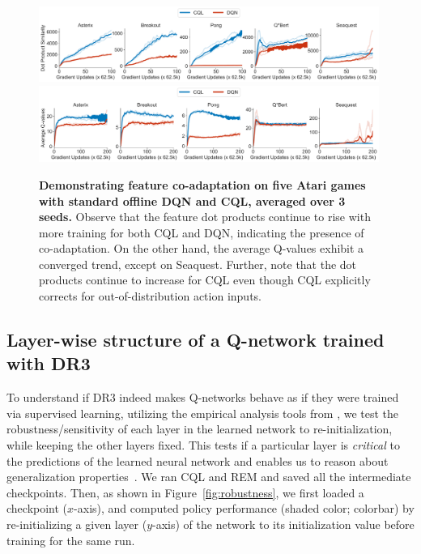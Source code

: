 \begin{figure}[H]
    \centering
    \vspace{-0.1in}
    \includegraphics[width=0.99\textwidth]{chapters/dr3/figures_iclr/figure1_dotproduct_value.pdf}
    \includegraphics[width=0.99\textwidth]{chapters/dr3/figures_iclr/figure1_q_vals.pdf}
    \vspace{-5pt}
    \caption{\footnotesize{\label{fig:dot_product_increases_five_games} \textbf{Demonstrating feature co-adaptation on five Atari games with standard offline DQN and CQL, averaged over 3 seeds.} Observe that the feature dot products continue to rise with more training for both CQL and DQN, indicating the presence of co-adaptation. On the other hand, the average Q-values exhibit a converged trend, except on Seaquest. Further, note that the dot products continue to increase for CQL even though CQL explicitly corrects for out-of-distribution action inputs. }}
    \vspace{-0.1in}
\end{figure}

\vspace{-0.1in}
\subsection{{Layer-wise structure of a Q-network trained with DR3}}
\label{app:layerwise}
\vspace{-0.05in}
To understand if DR3 indeed makes Q-networks behave as if they were trained via supervised learning, utilizing the empirical analysis tools from \citet{zhang2019all}, we test the robustness/sensitivity of each layer in the learned network to re-initialization, while keeping the other layers fixed. This tests if a particular layer is \emph{critical} to the predictions of the learned neural network and enables us to reason about generalization properties~\citep{zhang2019all,chatterji2019intriguing}. We ran CQL and REM and saved all the intermediate checkpoints. Then, as shown in Figure~\ref{fig:robustness}, we first loaded a checkpoint ($x$-axis), and computed policy performance (shaded color; colorbar)  by re-initializing a given layer ($y$-axis) of the network to its initialization value before training for the same run.

